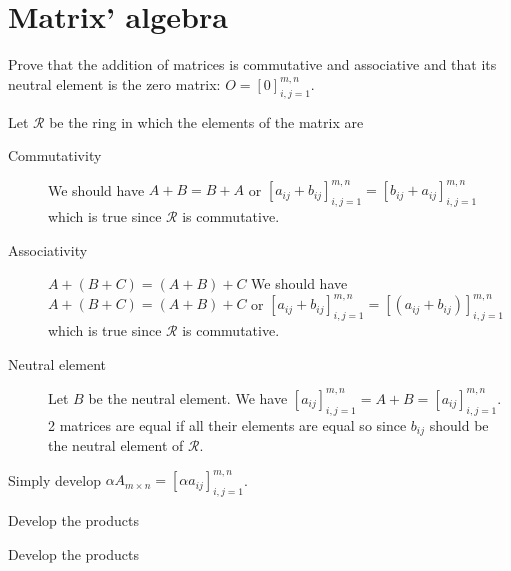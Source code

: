 \section{Matrix' algebra}
Prove that the addition of matrices is commutative and associative and that its neutral element is the zero matrix: $O = [0]_{i,j=1}^{m,n}$.
\begin{solution}
  Let $\mathcal{R}$ be the ring in which the elements of the matrix are
  \begin{description}
    \item[Commutativity]
      We should have $A+B=B+A$ or
      $[a_{ij} + b_{ij}]_{i,j=1}^{m,n} = [b_{ij} + a_{ij}]_{i,j=1}^{m,n}$
      which is true since $\mathcal{R}$ is commutative.
    \item[Associativity] $A+(B+C)=(A+B)+C$
      We should have $A+(B+C)=(A+B)+C$ or
      $[a_{ij} + b_{ij}]_{i,j=1}^{m,n} = [(a_{ij} + b_{ij})]_{i,j=1}^{m,n}$
      which is true since $\mathcal{R}$ is commutative.
    \item[Neutral element] Let $B$ be the neutral element.
      We have
      $[a_{ij}]_{i,j=1}^{m,n} = A + B = [a_{ij}]_{i,j=1}^{m,n}$.
      2 matrices are equal if all their elements are equal so since $b_{ij}$
      should be the neutral element of $\mathcal{R}$.
  \end{description}
\end{solution}

\begin{solution}
  Simply develop $\alpha A_{m \times n}=[\alpha a_{ij}]_{i,j=1}^{m,n}$.
\end{solution}

\begin{solution}
  Develop the products
\end{solution}

\begin{solution}
  Develop the products
\end{solution}

